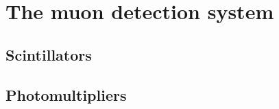 
\chapter{The muon detection system}
\label{ch:MuonDetectionSystem}


  \section{Scintillators}
  \label{ch:MuonDetectionSystem:sec:Scintillators}

  \section{Photomultipliers}
  \label{ch:MuonDetectionSystem:sec:Photomultipliers}

